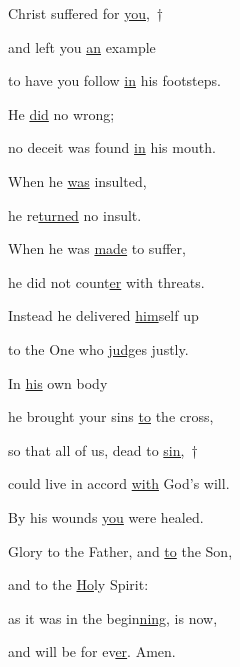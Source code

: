 \noindent Christ suffered for \uline{you,}~†~\nopagebreak

and left you \uline{an} example ~\GreStar{}~\nopagebreak

to have you follow \uline{in} his footsteps.

\noindent He \uline{did} no wrong; ~\GreStar{}~\nopagebreak

no deceit was found \uline{in} his mouth.

\noindent When he \uline{was} insulted, ~\GreStar{}~\nopagebreak

he re\uline{turned} no insult.

\noindent When he was \uline{made} to suffer, ~\GreStar{}~\nopagebreak

he did not count\uline{er} with threats.

\noindent Instead he delivered \uline{him}self up ~\GreStar{}~\nopagebreak

to the One who \uline{judg}es justly.

\noindent In \uline{his} own body ~\GreStar{}~\nopagebreak

he brought your sins \uline{to} the cross,

\noindent so that all of us, dead to \uline{sin,}~†~\nopagebreak

could live in accord \uline{with} God’s will. ~\GreStar{}~\nopagebreak

By his wounds \uline{you} were healed.

\noindent Glory to the Father, and \uline{to} the Son,~\GreStar{}~\nopagebreak

and to the \uline{Ho}ly Spirit:

\noindent as it was in the begin\uline{ning}, is now,~\GreStar{}~\nopagebreak

and will be for ev\uline{er}. Amen.
